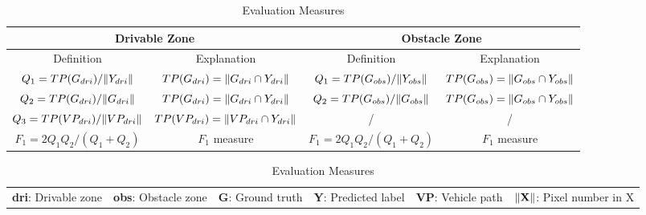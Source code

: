 \documentclass[letterpaper, 10 pt, conference]{ieeeconf}  %
\begin{document}
\begin{table}
	\vspace{2mm}
	\caption{Evaluation Measures}
	\label{tab:evaluation}
	\centering
	\renewcommand{\arraystretch}{1.5}
	\begin{tabular}{cclccl}
		\hline
		\multicolumn{3}{c|}{Drivable Zone}                                                                                                    & \multicolumn{3}{c}{Obstacle Zone}                                                                                                  \\ \hline
		Definition                                            & \multicolumn{2}{c|}{Explanation}                                               & Definition                                          & \multicolumn{2}{c}{Explanation}                                               \\ \hline
		$Q_1={TP(G_{dri})}/{\Arrowvert Y_{dri} \Arrowvert}$   & \multicolumn{2}{c|}{$TP(G_{dri})=\Arrowvert G_{dri}\cap Y_{dri} \Arrowvert$}   & $Q_1={TP(G_{obs})}/{\Arrowvert Y_{obs} \Arrowvert}$ & \multicolumn{2}{c}{$TP(G_{obs})=\Arrowvert G_{obs}\cap Y_{obs} \Arrowvert$}   \\
		$Q_2={TP(G_{dri})}/{\Arrowvert G_{dri} \Arrowvert}$   & \multicolumn{2}{c|}{$TP(G_{dri})=\Arrowvert G_{dri}\cap Y_{dri} \Arrowvert$}   & $Q_2={TP(G_{obs})}/{\Arrowvert G_{obs} \Arrowvert}$ & \multicolumn{2}{c}{$TP(G_{obs})=\Arrowvert G_{obs}\cap Y_{obs} \Arrowvert$}   \\
		$Q_3={TP(VP_{dri})}/{\Arrowvert VP_{dri} \Arrowvert}$ & \multicolumn{2}{c|}{$TP(VP_{dri})=\Arrowvert VP_{dri}\cap Y_{dri} \Arrowvert$} & /                                                   & \multicolumn{2}{c}{/}                                                         \\
		$F_1={2Q_1Q_2}/{(Q_1+Q_2)}$                           & \multicolumn{2}{c|}{$F_1$ measure}                                            & $F_1={2Q_1Q_2}/{(Q_1+Q_2)}$                         & \multicolumn{2}{c}{$F_1$ measure}                                             \\ 
		\hline
	\end{tabular}
	\renewcommand{\arraystretch}{2.3}
	\begin{tabular}{llllll}
		\textbf{dri}: Drivable zone                 & \textbf{obs}: Obstacle zone              & \textbf{G}: Ground truth                            & \textbf{Y}: Predicted label & \textbf{VP}: Vehicle path & $\Arrowvert \textbf{X}\Arrowvert$: Pixel number in X \\
	\end{tabular}
	\vspace{-4mm}
\end{table}
\end{document}
